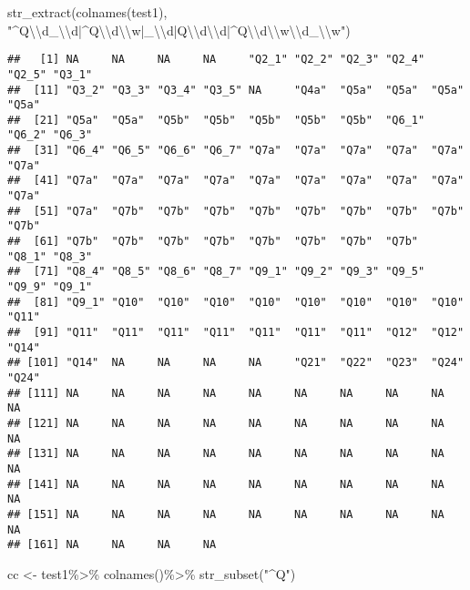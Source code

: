 \documentclass[
]{article}
\newenvironment{Shaded}{\begin{snugshade}}{\end{snugshade}}
\newcommand{\FunctionTok}[1]{\textcolor[rgb]{0.00,0.00,0.00}{#1}}
\newcommand{\NormalTok}[1]{#1}
\newcommand{\OtherTok}[1]{\textcolor[rgb]{0.56,0.35,0.01}{#1}}
\newcommand{\SpecialCharTok}[1]{\textcolor[rgb]{0.00,0.00,0.00}{#1}}
\newcommand{\StringTok}[1]{\textcolor[rgb]{0.31,0.60,0.02}{#1}}
\begin{document}
\begin{Shaded}
\begin{Highlighting}[]
\FunctionTok{str\_extract}\NormalTok{(}\FunctionTok{colnames}\NormalTok{(test1), }\StringTok{"\^{}Q}\SpecialCharTok{\textbackslash{}\textbackslash{}}\StringTok{d\_}\SpecialCharTok{\textbackslash{}\textbackslash{}}\StringTok{d|\^{}Q}\SpecialCharTok{\textbackslash{}\textbackslash{}}\StringTok{d}\SpecialCharTok{\textbackslash{}\textbackslash{}}\StringTok{w|\_}\SpecialCharTok{\textbackslash{}\textbackslash{}}\StringTok{d|Q}\SpecialCharTok{\textbackslash{}\textbackslash{}}\StringTok{d}\SpecialCharTok{\textbackslash{}\textbackslash{}}\StringTok{d|\^{}Q}\SpecialCharTok{\textbackslash{}\textbackslash{}}\StringTok{d}\SpecialCharTok{\textbackslash{}\textbackslash{}}\StringTok{w}\SpecialCharTok{\textbackslash{}\textbackslash{}}\StringTok{d\_}\SpecialCharTok{\textbackslash{}\textbackslash{}}\StringTok{w"}\NormalTok{)}
\end{Highlighting}
\end{Shaded}

\begin{verbatim}
##   [1] NA     NA     NA     NA     "Q2_1" "Q2_2" "Q2_3" "Q2_4" "Q2_5" "Q3_1"
##  [11] "Q3_2" "Q3_3" "Q3_4" "Q3_5" NA     "Q4a"  "Q5a"  "Q5a"  "Q5a"  "Q5a" 
##  [21] "Q5a"  "Q5a"  "Q5b"  "Q5b"  "Q5b"  "Q5b"  "Q5b"  "Q6_1" "Q6_2" "Q6_3"
##  [31] "Q6_4" "Q6_5" "Q6_6" "Q6_7" "Q7a"  "Q7a"  "Q7a"  "Q7a"  "Q7a"  "Q7a" 
##  [41] "Q7a"  "Q7a"  "Q7a"  "Q7a"  "Q7a"  "Q7a"  "Q7a"  "Q7a"  "Q7a"  "Q7a" 
##  [51] "Q7a"  "Q7b"  "Q7b"  "Q7b"  "Q7b"  "Q7b"  "Q7b"  "Q7b"  "Q7b"  "Q7b" 
##  [61] "Q7b"  "Q7b"  "Q7b"  "Q7b"  "Q7b"  "Q7b"  "Q7b"  "Q7b"  "Q8_1" "Q8_3"
##  [71] "Q8_4" "Q8_5" "Q8_6" "Q8_7" "Q9_1" "Q9_2" "Q9_3" "Q9_5" "Q9_9" "Q9_1"
##  [81] "Q9_1" "Q10"  "Q10"  "Q10"  "Q10"  "Q10"  "Q10"  "Q10"  "Q10"  "Q11" 
##  [91] "Q11"  "Q11"  "Q11"  "Q11"  "Q11"  "Q11"  "Q11"  "Q12"  "Q12"  "Q14" 
## [101] "Q14"  NA     NA     NA     NA     "Q21"  "Q22"  "Q23"  "Q24"  "Q24" 
## [111] NA     NA     NA     NA     NA     NA     NA     NA     NA     NA    
## [121] NA     NA     NA     NA     NA     NA     NA     NA     NA     NA    
## [131] NA     NA     NA     NA     NA     NA     NA     NA     NA     NA    
## [141] NA     NA     NA     NA     NA     NA     NA     NA     NA     NA    
## [151] NA     NA     NA     NA     NA     NA     NA     NA     NA     NA    
## [161] NA     NA     NA     NA
\end{verbatim}

\begin{Shaded}
\begin{Highlighting}[]
\NormalTok{cc }\OtherTok{\textless{}{-}}\NormalTok{ test1}\SpecialCharTok{\%\textgreater{}\%}
  \FunctionTok{colnames}\NormalTok{()}\SpecialCharTok{\%\textgreater{}\%}
  \FunctionTok{str\_subset}\NormalTok{(}\StringTok{"\^{}Q"}\NormalTok{)}
\end{Highlighting}
\end{Shaded}
\end{document}
